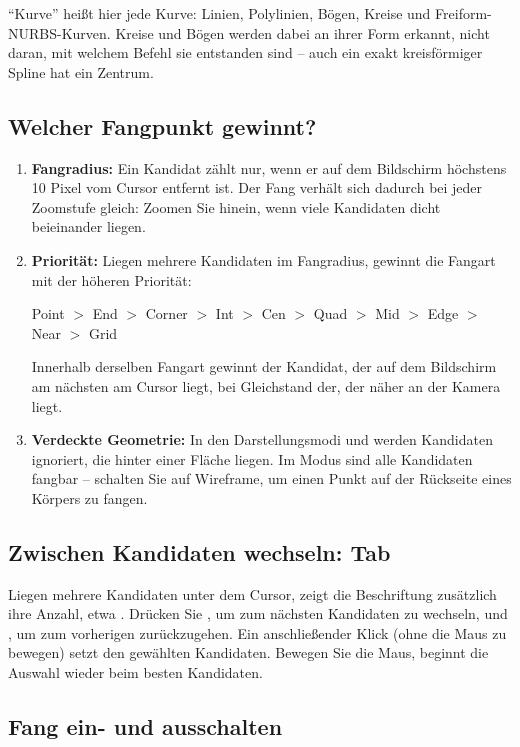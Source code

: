 \enquote{Kurve} heißt hier jede Kurve: Linien, Polylinien, Bögen, Kreise und
Freiform-NURBS-Kurven. Kreise und Bögen werden dabei an ihrer Form erkannt, nicht daran, mit
welchem Befehl sie entstanden sind -- auch ein exakt kreisförmiger Spline hat ein Zentrum.

\subsection{Welcher Fangpunkt gewinnt?}

\begin{enumerate}
\item \textbf{Fangradius:} Ein Kandidat zählt nur, wenn er auf dem Bildschirm höchstens
  \num{10} Pixel vom Cursor entfernt ist. Der Fang verhält sich dadurch bei jeder Zoomstufe
  gleich: Zoomen Sie hinein, wenn viele Kandidaten dicht beieinander liegen.
\item \textbf{Priorität:} Liegen mehrere Kandidaten im Fangradius, gewinnt die Fangart mit der
  höheren Priorität:
  \begin{center}
  Point $>$ End $>$ Corner $>$ Int $>$ Cen $>$ Quad $>$ Mid $>$ Edge $>$ Near $>$ Grid
  \end{center}
  Innerhalb derselben Fangart gewinnt der Kandidat, der auf dem Bildschirm am nächsten am
  Cursor liegt, bei Gleichstand der, der näher an der Kamera liegt.
\item \textbf{Verdeckte Geometrie:} In den Darstellungsmodi  und 
  werden Kandidaten ignoriert, die hinter einer Fläche liegen. Im Modus  sind
  alle Kandidaten fangbar -- schalten Sie auf Wireframe, um einen Punkt auf der Rückseite eines
  Körpers zu fangen.
\end{enumerate}

\subsection{Zwischen Kandidaten wechseln: Tab}

Liegen mehrere Kandidaten unter dem Cursor, zeigt die Beschriftung zusätzlich ihre Anzahl, etwa
. Drücken Sie , um zum nächsten Kandidaten zu wechseln, und
, um zum vorherigen zurückzugehen. Ein anschließender Klick (ohne die Maus zu
bewegen) setzt den gewählten Kandidaten. Bewegen Sie die Maus, beginnt die Auswahl wieder beim
besten Kandidaten.

\subsection{Fang ein- und ausschalten}

